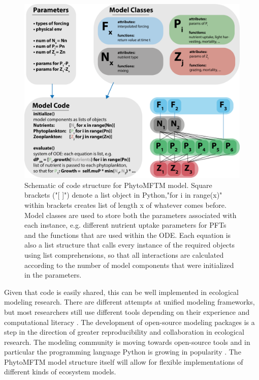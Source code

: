 \begin{figure}
\centering
\includegraphics[trim = 0mm 0mm 0mm 0mm, clip, width=1.\linewidth]{./Chp22-Pre2/OOPmodelstructureDraft.png}
\caption[Scheme]{\small {Schematic of code structure for PhytoMFTM model. Square brackets ("[ ]") denote a list object in Python,"for i in range(x)" within brackets creates list of length x of whatever comes before. Model classes are used to store both the parameters associated with each instance, e.g. different nutrient uptake parameters for PFTs and the functions that are used within the ODE. Each equation is also a list structure that calls every instance of the required objects using list comprehensions, so that all interactions are calculated according to the number of model components that were initialized in the parameters.}}
\label{PhytoMFTM}
\end{figure}

Given that code is easily shared, this can be well implemented in ecological modeling research. There are different attempts at unified modeling frameworks, but most researchers still use different tools depending on their experience and computational literacy \citep{Michener2012}. The development of open-source modeling packages is a step in the direction of greater reproducibility and collaboration in ecological research. The modeling community is moving towards open-source tools and in particular the programming language Python is growing in popularity \citep{Lin2012}. The PhytoMFTM model structure itself will allow for flexible implementations of different kinds of ecosystem models. 






